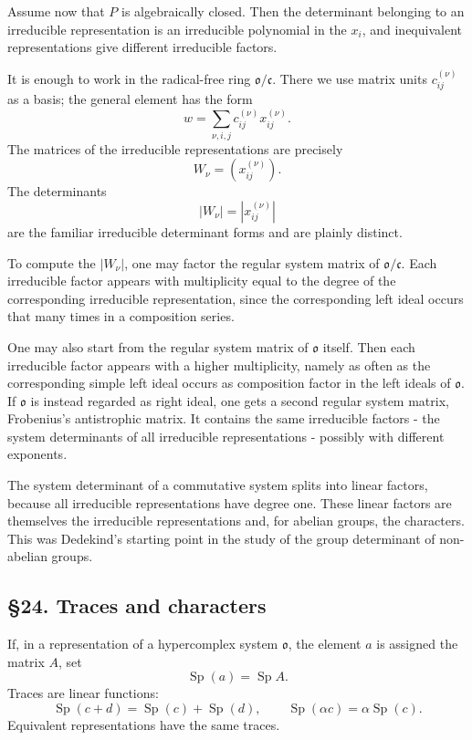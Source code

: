\documentclass[
  11pt,
]{article}
\begin{document}
Assume now that \(P\) is algebraically closed. Then the determinant
belonging to an irreducible representation is an irreducible polynomial
in the \(x_i\), and inequivalent representations give different
irreducible factors.

It is enough to work in the radical-free ring
\(\mathfrak{o}/\mathfrak c\). There we use matrix units
\(c_{ij}^{(\nu)}\) as a basis; the general element has the form \[
  w=\sum_{\nu,i,j} c_{ij}^{(\nu)}x_{ij}^{(\nu)}.
\] The matrices of the irreducible representations are precisely \[
  W_\nu=(x_{ij}^{(\nu)}).
\] The determinants \[
  |W_\nu|=|x_{ij}^{(\nu)}|
\] are the familiar irreducible determinant forms and are plainly
distinct.

To compute the \(|W_\nu|\), one may factor the regular system matrix of
\(\mathfrak{o}/\mathfrak c\). Each irreducible factor appears with
multiplicity equal to the degree of the corresponding irreducible
representation, since the corresponding left ideal occurs that many
times in a composition series.

One may also start from the regular system matrix of \(\mathfrak{o}\)
itself. Then each irreducible factor appears with a higher multiplicity,
namely as often as the corresponding simple left ideal occurs as
composition factor in the left ideals of \(\mathfrak{o}\). If
\(\mathfrak{o}\) is instead regarded as right ideal, one gets a second
regular system matrix, Frobenius's antistrophic matrix. It contains the
same irreducible factors - the system determinants of all irreducible
representations - possibly with different exponents.

The system determinant of a commutative system splits into linear
factors, because all irreducible representations have degree one. These
linear factors are themselves the irreducible representations and, for
abelian groups, the characters. This was Dedekind's starting point in
the study of the group determinant of non-abelian groups.

\subsection{§24. Traces and characters}\label{traces-and-characters}

If, in a representation of a hypercomplex system \(\mathfrak{o}\), the
element \(a\) is assigned the matrix \(A\), set \[
  \operatorname{Sp}(a)=\operatorname{Sp} A.
\] Traces are linear functions: \[
  \operatorname{Sp}(c+d)=\operatorname{Sp}(c)+\operatorname{Sp}(d),
  \qquad
  \operatorname{Sp}(\alpha c)=\alpha\operatorname{Sp}(c).
\] Equivalent representations have the same traces.
\end{document}
